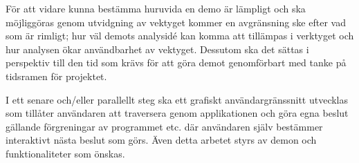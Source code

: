 För att vidare kunna bestämma huruvida en demo är lämpligt och ska möjliggöras
genom utvidgning av vektyget kommer en avgränsning ske efter vad som är rimligt;
hur väl demots analysidé kan komma att tillämpas i verktyget och hur analysen
ökar användbarhet av vektyget. Dessutom ska det sättas i perspektiv till den tid
som krävs för att göra demot genomförbart med tanke på tidsramen för projektet.

I ett senare och/eller parallellt steg ska ett grafiskt användargränssnitt
utvecklas som tillåter användaren att traversera genom applikationen och göra
egna beslut gällande förgreningar av programmet etc. där användaren själv
bestämmer interaktivt nästa beslut som görs. Även detta arbetet styrs av demon
och funktionaliteter som önskas.




%

